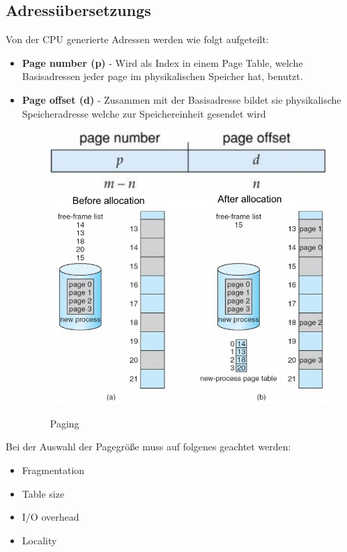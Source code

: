 \documentclass[a4paper]{scrreprt}
\begin{document}
\subsection{Adressübersetzungs}
Von der CPU generierte Adressen werden wie folgt aufgeteilt:
\begin{itemize}
\item \textbf{Page number (p)} - Wird als Index in einem Page Table, welche Basisadressen jeder page im physikalischen Speicher hat, benutzt.
\item \textbf{Page offset (d)} - Zusammen mit der Basisadresse bildet sie physikalische Speicheradresse welche zur Speichereinheit gesendet wird
\begin{figure}[ht]
\centering
\includegraphics[scale=0.40]{graphics/numberoffset.png}
\includegraphics[scale=0.50]{graphics/paging1.png}
\caption{Paging}
\end{figure}

\end{itemize}



Bei der Auswahl der Pagegröße muss auf folgenes geachtet werden:
\begin{itemize}
\item Fragmentation
\item Table size
\item I/O overhead
\item Locality
\end{itemize}
\end{document}
